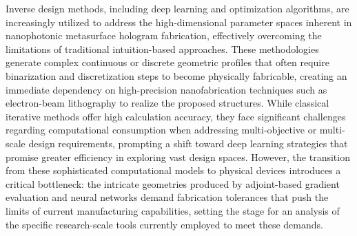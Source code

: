 \documentclass[11pt]{article}
\begin{document}
Inverse design methods, including deep learning and optimization algorithms, are increasingly utilized to address the high-dimensional parameter spaces inherent in nanophotonic metasurface hologram fabrication, effectively overcoming the limitations of traditional intuition-based approaches. \citep{doi_10_1109_metamaterials54993_2022_9920895_1a67346a} These methodologies generate complex continuous or discrete geometric profiles that often require binarization and discretization steps to become physically fabricable, creating an immediate dependency on high-precision nanofabrication techniques such as electron-beam lithography to realize the proposed structures. While classical iterative methods offer high calculation accuracy, they face significant challenges regarding computational consumption when addressing multi-objective or multi-scale design requirements, prompting a shift toward deep learning strategies that promise greater efficiency in exploring vast design spaces. However, the transition from these sophisticated computational models to physical devices introduces a critical bottleneck: the intricate geometries produced by adjoint-based gradient evaluation and neural networks demand fabrication tolerances that push the limits of current manufacturing capabilities, setting the stage for an analysis of the specific research-scale tools currently employed to meet these demands. \citep{doi_10_1088_1361_6439_ad3a72_72d60f33} \citep{doi_10_48550_arxiv_2603_15210_fdcfb92f} \citep{doi_10_1109_metamaterials54993_2022_9920895_1a67346a}
\end{document}
